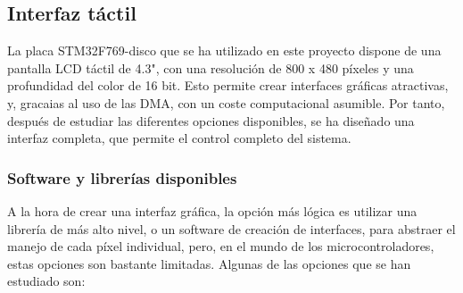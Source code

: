 \subsection{Interfaz táctil}

La placa STM32F769-disco que se ha utilizado en este proyecto dispone de una pantalla LCD táctil de 4.3", con una resolución de 800 x 480 píxeles y una profundidad del color de 16 bit. Esto permite crear interfaces gráficas atractivas, y, gracaias al uso de las DMA, con un coste computacional asumible. Por tanto, después de estudiar las diferentes opciones disponibles, se ha diseñado una interfaz completa, que permite el control completo del sistema.
\subsubsection{Software y librerías disponibles}
A la hora de crear una interfaz gráfica, la opción más lógica es utilizar una librería de más alto nivel, o un software de creación de interfaces, para abstraer el manejo de cada píxel individual, pero, en el mundo de los microcontroladores, estas opciones son bastante limitadas. Algunas de las opciones que se han estudiado son:
